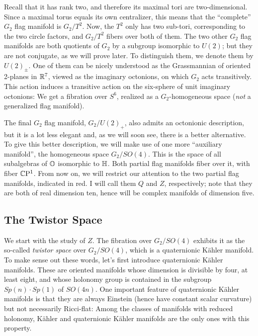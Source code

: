 \documentclass[parskip=half]{scrartcl}
\begin{document}
Recall that it has rank two, and therefore its maximal tori are two-dimensional. Since a maximal torus equals its own centralizer, this means that the ``complete'' $G_2$ flag manifold is $G_2/T^2$. Now, the $T^2$ only has two sub-tori, corresponding to the two circle factors, and $G_2/T^2$ fibers over both of them. The two other $G_2$ flag manifolds are both quotients of $G_2$ by a subgroup isomorphic to $U(2)$; but they are not conjugate, as we will prove later. To distinguish them, we denote them by $U(2)_\pm$. One of them can be nicely understood as the Grassmannian of oriented 2-planes in $\mathbb{R}^7$, viewed as the imaginary octonions, on which $G_2$ acts transitively. This action induces a transitive action on the six-sphere of unit imaginary octonions: We get a fibration over $S^6$, realized as a $G_2$-homogeneous space (\emph{not} a generalized flag manifold).

The final $G_2$ flag manifold, $G_2/U(2)_+$, also admits an octonionic description, but it is a lot less elegant and, as we will soon see, there is a better alternative. To give this better description, we will make use of one more ``auxiliary manifold'', the homogeneous space $G_2/SO(4)$. This is the space of all subalgebras of $\mathbb{O}$ isomorphic to $\mathbb{H}$. Both partial flag manifolds fiber over it, with fiber $\mathbb{C}\mathrm{P}^1$. From now on, we will restrict our attention to the two partial flag manifolds, indicated in red. I will call them $Q$ and $Z$, respectively; note that they are both of real dimension ten, hence will be complex manifolds of dimension five.

\subsection{The Twistor Space}

We start with the study of $Z$. The fibration over $G_2/SO(4)$ exhibits it as the so-called \emph{twistor space} over $G_2/SO(4)$, which is a quaternionic K\"ahler manifold. To make sense out these words, let's first introduce quaternionic K\"ahler manifolds. These are oriented manifolds whose dimension is divisible by four, at least eight, and whose holonomy group is contained in the subgroup $Sp(n)\cdot Sp(1)$ of $SO(4n)$. One important feature of quaternionic K\"ahler manifolds is that they are always Einstein (hence have constant scalar curvature) but not necessarily Ricci-flat: Among the classes of manifolds with reduced holonomy, K\"ahler and quaternionic K\"ahler manifolds are the only ones with this property.
\end{document}
